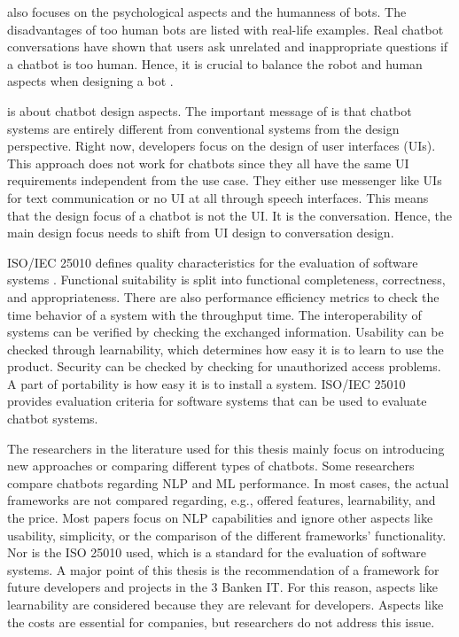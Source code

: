 \citet{brandtzaeg2018chatbots} also focuses on the psychological aspects and the humanness of bots.
The disadvantages of too human bots are listed with real-life examples. 
Real chatbot conversations have shown that users ask unrelated and inappropriate questions if a chatbot is too human. 
Hence, it is crucial to balance the robot and human aspects when designing a bot \cite{brandtzaeg2018chatbots}.

\citet{dutta2017developing} is about chatbot design aspects.
The important message of \citet{dutta2017developing} is that chatbot systems are entirely different from conventional systems from the design perspective.
Right now, developers focus on the design of user interfaces (UIs).
This approach does not work for chatbots since they all have the same UI requirements independent from the use case.
They either use messenger like UIs for text communication or no UI at all through speech interfaces.
This means that the design focus of a chatbot is not the UI.
It is the conversation.
Hence, the main design focus needs to shift from UI design to conversation design.




ISO/IEC 25010 defines quality characteristics for the evaluation of software systems \cite{iso25010}.
Functional suitability is split into functional completeness, correctness, and appropriateness.
There are also performance efficiency metrics to check the time behavior of a system with the throughput time.
The interoperability of systems can be verified by checking the exchanged information.
Usability can be checked through learnability, which determines how easy it is to learn to use the product.
Security can be checked by checking for unauthorized access problems.
A part of portability is how easy it is to install a system.
ISO/IEC 25010 provides evaluation criteria for software systems that can be used to evaluate chatbot systems.


The researchers in the literature used for this thesis mainly focus on introducing new approaches or comparing different types of chatbots.
Some researchers compare chatbots regarding NLP and ML performance.
In most cases, the actual frameworks are not compared regarding, e.g., offered features, learnability, and the price.
Most papers focus on NLP capabilities and ignore other aspects like usability, simplicity, or the comparison of the different frameworks' functionality.
Nor is the ISO 25010\cite{iso25010} used, which is a standard for the evaluation of software systems.
A major point of this thesis is the recommendation of a framework for future developers and projects in the 3 Banken IT.
For this reason, aspects like learnability are considered because they are relevant for developers.
Aspects like the costs are essential for companies, but researchers do not address this issue.

